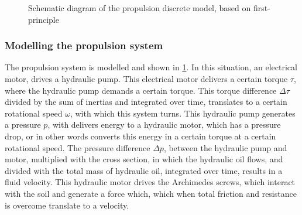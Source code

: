 \begin{figure}[H]
\begin{center}
	\end{center}
	\caption{Schematic diagram of the propulsion discrete model, based on first-principle}\label{fig:propulsionsystemsimulinkmodel}
\end{figure}

\subsubsection{Modelling the propulsion system}
The propulsion system is modelled and shown in \ref{fig:propulsionsystemsimulinkmodel}. In this situation, an electrical motor, drives a hydraulic pump. This electrical motor delivers a certain torque $ \tau $, where the hydraulic pump demands a certain torque. This torque difference $ \Delta \tau $ divided by the sum of inertias and integrated over time, translates to a certain rotational speed $ \omega $, with which this system turns. This hydraulic pump generates a pressure $ p $, with delivers energy to a hydraulic motor, which has a pressure drop, or in other words converts this energy in a certain torque at a certain rotational speed. The pressure difference $ \Delta p $, between the hydraulic pump and motor, multiplied with the cross section, in which the hydraulic oil flows, and divided with the total mass of hydraulic oil, integrated over time, results in a fluid velocity. This hydraulic motor drives the Archimedes screws, which interact with the soil and generate a force which, which when total friction and resistance is overcome translate to a velocity.

